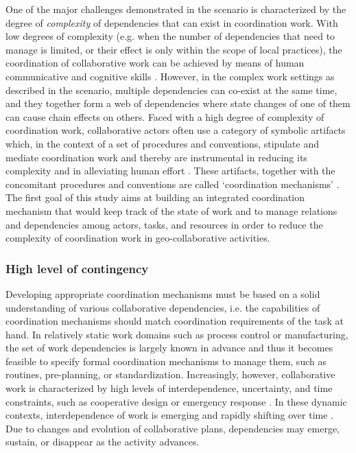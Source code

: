 One of the major challenges demonstrated in the scenario is characterized by the degree of \emph{complexity} of dependencies that can exist in coordination work. With low degrees of complexity (e.g. when the number of dependencies that need to manage is limited, or their effect is only within the scope of local practices), the coordination of collaborative work can be achieved by means of human communicative and cognitive skills \cite{schmidt1996a}. However, in the complex work settings as described in the scenario, multiple dependencies can co-exist at the same time, and they together form a web of dependencies where state changes of one of them can cause chain effects on others. Faced with a high degree of complexity of coordination work, collaborative actors often use a category of symbolic artifacts which, in the context of a set of procedures and conventions, stipulate and mediate coordination work and thereby are instrumental in reducing its complexity and in alleviating human effort \cite{simone1995notation}. These artifacts, together with the concomitant procedures and conventions are called `coordination mechanisms' \cite{schmidt1996a}. The first goal of this study aims at building an integrated coordination mechanism that would keep track of the state of work and to manage relations and dependencies among actors, tasks, and resources in order to reduce the complexity of coordination work in geo-collaborative activities.

\subsubsection{High level of contingency} %
\label{ssub:high_level_of_contingency}
Developing appropriate coordination mechanisms must be based on a solid understanding of various collaborative dependencies, i.e. the capabilities of coordination mechanisms should match coordination requirements of the task at hand. In relatively static work domains such as process control or manufacturing, the set of work dependencies is largely known in advance and thus it becomes feasible to specify formal coordination mechanisms to manage them, such as routines, pre-planning, or standardization. Increasingly, however, collaborative work is characterized by high levels of interdependence, uncertainty, and time constraints, such as cooperative design \cite{carstensen1999computer} or emergency response \cite{shen2004managing}. In these dynamic contexts, interdependence of work is emerging and rapidly shifting over time \cite{espinosa2004explicit}. Due to changes and evolution of collaborative plans, dependencies may emerge, sustain, or disappear as the activity advances. 

